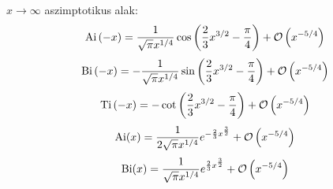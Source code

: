 $x \to \infty$ aszimptotikus alak:
\begin{equation}
	\mathrm{Ai}\left(-x\right) = \frac{1}{\sqrt{\pi}x^{1/4}}\cos\left(\frac{2}{3}x^{3/2} - \frac{\pi}{4}\right) + \mathcal{O}\left(x^{-5/4}\right)
\end{equation}
\begin{equation}
	\mathrm{Bi}\left(-x\right) = -\frac{1}{\sqrt{\pi}x^{1/4}}\sin\left(\frac{2}{3}x^{3/2} - \frac{\pi}{4}\right) + \mathcal{O}\left(x^{-5/4}\right)
\end{equation}
\begin{equation}
	\mathrm{Ti}\left(-x\right) = -\cot\left( \frac{2}{3}x^{3/2} - \frac{\pi}{4} \right) + \mathcal{O}\left(x^{-5/4}\right)
\end{equation}
\begin{equation}
	\mathrm{Ai}(x) = \frac{1}{2\sqrt{\pi}x^{1/4}}e^{-\frac{2}{3}x^{\frac{3}{2}}}+\mathcal{O}\left(x^{-5/4}\right)
\end{equation}
\begin{equation}
	\mathrm{Bi}(x) = \frac{1}{ \sqrt{\pi}x^{1/4}}e^{ \frac{2}{3}x^{\frac{3}{2}}}+\mathcal{O}\left(x^{-5/4}\right)
\end{equation}









